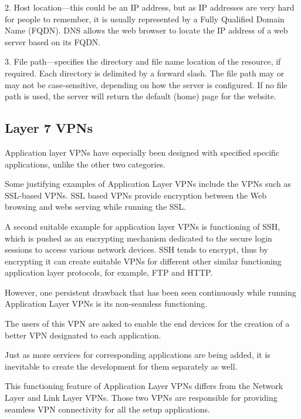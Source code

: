 2. Host location—this could be an IP address, but as IP addresses are very hard
for people to remember, it is usually represented by a Fully Qualified Domain
Name (FQDN). DNS allows the web browser to locate the IP address of a web server
based on its FQDN.

3. File path—specifies the directory and file name location of the resource, if
required. Each directory is delimited by a forward slash. The file path may or
may not be case-sensitive, depending on how the server is configured. If no file
path is used, the server will return the default (home) page for the website. 

\subsectionend

\subsection{Layer 7 VPNs}
\label{ssec:layer_7_vpns}
Application layer VPNs have especially been designed with specified specific applications, unlike the other two categories.

Some justifying examples of Application Layer VPNs include the VPNs such as SSL-based VPNs. SSL based VPNs provide encryption between the Web browsing and webs serving while running the SSL.

A second suitable example for application layer VPNs is functioning of SSH, which is pushed as an encrypting mechanism dedicated to the secure login sessions to access various network devices. SSH tends to encrypt, thus by encrypting it can create suitable VPNs for different other similar functioning application layer protocols, for example, FTP and HTTP.

However, one persistent drawback that has been seen continuously while running Application Layer VPNs is its non-seamless functioning.

The users of this VPN are asked to enable the end devices for the creation of a better VPN designated to each application.

Just as more services for corresponding applications are being added, it is inevitable to create the development for them separately as well.

This functioning feature of Application Layer VPNs differs from the Network Layer and Link Layer VPNs. Those two VPNs are responsible for providing seamless VPN connectivity for all the setup applications.

\subsectionend


\sectionend
